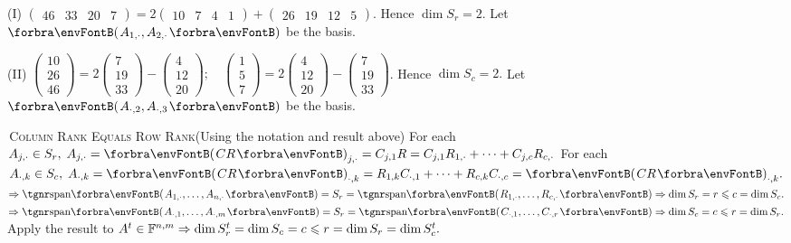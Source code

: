 \documentclass[a4paper, 11pt, UTF8]{article}
\begin{document}
\begin{large}
(I) {\normalsize$\begin{pmatrix} 46 & 33 & 20 & 7 \end{pmatrix}=2\begin{pmatrix} 10 & 7 & 4 & 1\end{pmatrix}+\begin{pmatrix} 26 & 19 & 12 & 5\end{pmatrix}$}.
Hence $\dim S_r=2$. Let $\Par{A_{1,\cdot},A_{2,\cdot}}$ be the basis.\par\vspace{6pt}\quad\EndI
(II) {\normalsize$\begin{pmatrix} 10\\ 26\\ 46\end{pmatrix}=2\begin{pmatrix} 7\\ 19\\ 33\end{pmatrix}-\begin{pmatrix} 4\\ 12\\ 20\end{pmatrix}; \quad \begin{pmatrix} 1\\ 5\\ 7\end{pmatrix}=2\begin{pmatrix} 4\\ 12\\ 20\end{pmatrix}-\begin{pmatrix} 7\\ 19\\ 33\end{pmatrix}$}. Hence $\dim S_c=2.$ Let $\Par{A_{\cdot,2},A_{\cdot,3}}$ be the basis.\vspace{6pt}\par
\SepLine
\pagebreak

\BulletPoint \,\hspace{1pt}\textsc{Column Rank Equals Row Rank}\quad (Using the notation and result above)\TextB{}
For each $A_{j,\cdot}\in S_r,\;A_{j,\cdot}=\Par{CR}_{j,\cdot}=C_{j,1}R=C_{j,1}R_{1,\cdot}+\dots+C_{j,c}R_{c,\cdot}$\TextB{}
For each $A_{\cdot,k}\in S_c,\;A_{\cdot,k}=\Par{CR}_{\cdot,k}=R_{1,k}C_{\cdot,1}+\dots+R_{c,k}C_{\cdot,c}=\Par{CR}_{\cdot,k}.$\TextB{}
$\Rightarrow\Span{A_{1,\cdot},\dots,A_{n,\cdot}}=S_r=\Span{R_{1,\cdot},\dots,R_{c,\cdot}}\Rightarrow\dim S_r=r\leqslant c=\dim S_c.$\TextB{}
$\Rightarrow\Span{A_{\cdot,1},\dots,A_{\cdot,m}}=S_r=\Span{C_{\cdot,1},\dots,C_{\cdot,r}}\Rightarrow\dim S_c=c\leqslant r=\dim S_r.$\TextB{}
\Or Apply the result to $A^t\in{\mathbb{F}}^{n,m}\Rightarrow\dim S_r^t=\dim S_c=c\leqslant r=\dim S_r=\dim S_c^t.$\PfEnd
\SepLine



\end{large}
\end{document}
